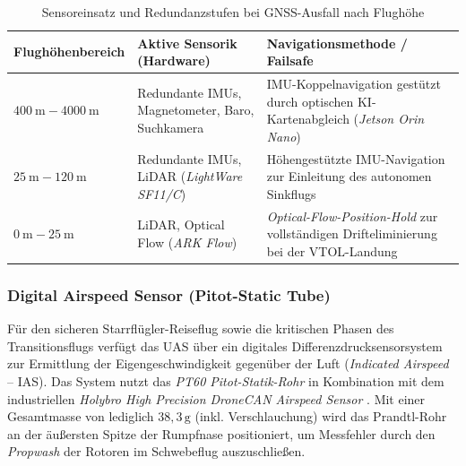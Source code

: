 \begin{table}[h!]
    \centering
    \caption{Sensoreinsatz und Redundanzstufen bei GNSS-Ausfall nach Flughöhe}
    \vspace{0.2cm}
    \begin{tabular}{p{3.2cm} p{4.2cm} p{4.6cm}}
        \toprule
        \textbf{Flughöhenbereich} & \textbf{Aktive Sensorik (Hardware)} & \textbf{Navigationsmethode / Failsafe} \\
        \midrule
        $\SI{400}{\m} - \SI{4000}{\m}$ & Redundante IMUs, Magnetometer, Baro, Suchkamera & IMU-Koppelnavigation gestützt durch optischen KI-Kartenabgleich (\textit{Jetson Orin Nano}) \\
        $\SI{25}{\m} - \SI{120}{\m}$ & Redundante IMUs, LiDAR (\textit{LightWare SF11/C}) & Höhengestützte IMU-Navigation zur Einleitung des autonomen Sinkflugs \\
        $\SI{0}{\m} - \SI{25}{\m}$ & LiDAR, Optical Flow (\textit{ARK Flow}) & \textit{Optical-Flow-Position-Hold} zur vollständigen Drifteliminierung bei der VTOL-Landung \\
        \bottomrule
    \end{tabular}
    \label{tab:navigation_failsafe_stages}
\end{table}

\subsubsection{Digital Airspeed Sensor (Pitot-Static Tube)}
\label{sec:airspeed_sensor}

Für den sicheren Starrflügler-Reiseflug sowie die kritischen Phasen des Transitionsflugs verfügt das UAS über ein digitales Differenzdrucksensorsystem zur Ermittlung der Eigengeschwindigkeit gegenüber der Luft (\textit{Indicated Airspeed} -- IAS). 
Das System nutzt das \textit{PT60 Pitot-Statik-Rohr} in Kombination mit dem industriellen \textit{Holybro High Precision DroneCAN Airspeed Sensor} \cite{holybro_dlvr_airspeed}. Mit einer Gesamtmasse von lediglich $38{,}3\,\text{g}$ (inkl. Verschlauchung) 
wird das Prandtl-Rohr an der äußersten Spitze der Rumpfnase positioniert, um Messfehler durch den \textit{Propwash} der Rotoren im Schwebeflug auszuschließen.

